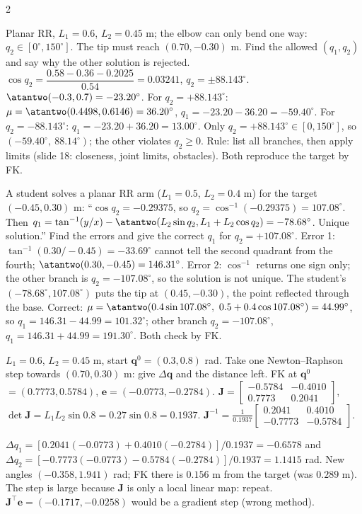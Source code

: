 \begin{multicols}{2}
\begin{examq}
Planar RR, $L_1=0.6$, $L_2=0.45$ m; the elbow can only bend one way: $q_2\in[0^\circ,150^\circ]$. The tip must reach $(0.70,-0.30)$ m. Find the allowed $(q_1,q_2)$ and say why the other solution is rejected.
\solution
$\cos q_2=\dfrac{0.58-0.36-0.2025}{0.54}=0.03241$, $q_2=\pm88.143^\circ$. $\atantwo(-0.3,0.7)=-23.20^\circ$. For $q_2=+88.143^\circ$: $\mu=\atantwo(0.4498,0.6146)=36.20^\circ$, $q_1=-23.20-36.20=-59.40^\circ$. For $q_2=-88.143^\circ$: $q_1=-23.20+36.20=13.00^\circ$. Only $q_2=+88.143^\circ\in[0,150^\circ]$, so \textbf{$(-59.40^\circ,\ 88.14^\circ)$}; the other violates $q_2\ge0$. Rule: list all branches, then apply limits (slide 18: closeness, joint limits, obstacles). Both reproduce the target by FK. \chk
\end{examq}

\begin{examq}
A student solves a planar RR arm ($L_1=0.5$, $L_2=0.4$ m) for the target $(-0.45,0.30)$ m: ``$\cos q_2=-0.29375$, so $q_2=\cos^{-1}(-0.29375)=107.08^\circ$. Then $q_1=\tan^{-1}(y/x)-\atantwo(L_2\sin q_2,L_1+L_2\cos q_2)=-78.68^\circ$. Unique solution.'' Find the errors and give the correct $q_1$ for $q_2=+107.08^\circ$.
\solution
Error 1: $\tan^{-1}(0.30/-0.45)=-33.69^\circ$ cannot tell the second quadrant from the fourth; $\atantwo(0.30,-0.45)=146.31^\circ$. Error 2: $\cos^{-1}$ returns one sign only; the other branch is $q_2=-107.08^\circ$, so the solution is not unique. The student's $(-78.68^\circ,107.08^\circ)$ puts the tip at $(0.45,-0.30)$, the point reflected through the base. Correct: $\mu=\atantwo(0.4\sin107.08^\circ,\ 0.5+0.4\cos107.08^\circ)=44.99^\circ$, so $q_1=146.31-44.99=\mathbf{101.32^\circ}$; other branch $q_2=-107.08^\circ$, $q_1=146.31+44.99=191.30^\circ$. Both check by FK. \chk
\end{examq}

\begin{examq}
$L_1=0.6$, $L_2=0.45$ m, start $\mathbf q^0=(0.3,0.8)$ rad. Take one Newton--Raphson step towards $(0.70,0.30)$ m: give $\Delta\mathbf q$ and the distance left.
\solution
FK at $\mathbf q^0$ $=(0.7773,0.5784)$, $\mathbf e=(-0.0773,-0.2784)$. $\mathbf J=\begin{bmatrix}-0.5784&-0.4010\\0.7773&0.2041\end{bmatrix}$, $\det\mathbf J=L_1L_2\sin0.8=0.27\sin0.8=0.1937$. $\mathbf J^{-1}=\frac1{0.1937}\begin{bmatrix}0.2041&0.4010\\-0.7773&-0.5784\end{bmatrix}$.\par $\Delta q_1=[0.2041(-0.0773)+0.4010(-0.2784)]/0.1937=-0.6578$ and $\Delta q_2=[-0.7773(-0.0773)-0.5784(-0.2784)]/0.1937=1.1415$ rad. New angles $(-0.358,1.941)$ rad; FK there is $0.156$ m from the target (was $0.289$ m). The step is large because $\mathbf J$ is only a local linear map: repeat. $\mathbf J^\top\mathbf e=(-0.1717,-0.0258)$ would be a gradient step (wrong method). \chk
\end{examq}
\end{multicols}
